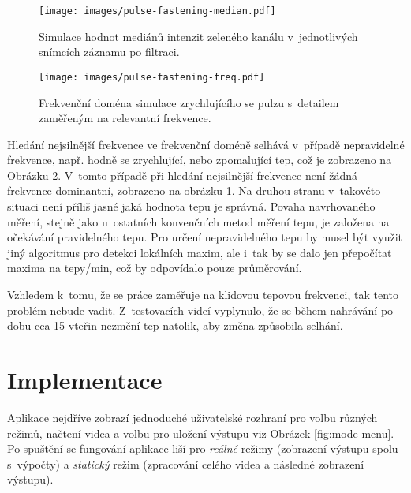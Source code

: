 \documentclass[
  digital, %
  table,   %
%
  lof,     %
  lot,     %
]{fithesis3}
\begin{document}
\begin{figure}
  \begin{center}
    \texttt{[image: images/pulse-fastening-median.pdf]}
  \end{center}
  \caption{Simulace hodnot mediánů intenzit zeleného kanálu v~jednotlivých snímcích záznamu po filtraci.}
  \label{fig:pulse_fastening_median}
\end{figure}

\begin{figure}
  \begin{center}
    \texttt{[image: images/pulse-fastening-freq.pdf]}
  \end{center}
  \caption{Frekvenční doména simulace zrychlujícího se pulzu s~detailem zaměřeným na relevantní frekvence.}
  \label{fig:fastening_pulse_freq}
\end{figure}

Hledání nejsilnější frekvence ve frekvenční doméně selhává v~případě nepravidelné frekvence, např. hodně se zrychlující, nebo  zpomalující tep, což je zobrazeno na Obrázku \ref{fig:fastening_pulse_freq}. V~tomto případě při hledání nejsilnější frekvence není žádná frekvence dominantní, zobrazeno na obrázku \ref{fig:pulse_fastening_median}. Na druhou stranu v~takovéto situaci není příliš jasné jaká hodnota tepu je správná. Povaha navrhovaného měření, stejně jako u~ostatních konvenčních metod měření tepu, je založena na očekávání pravidelného tepu. Pro určení nepravidelného tepu by musel být využit jiný algoritmus pro detekci lokálních maxim, ale i~tak by se dalo jen přepočítat maxima na tepy/min, což by odpovídalo pouze průměrování.  

Vzhledem k~tomu, že se práce zaměřuje na klidovou tepovou frekvenci, tak tento problém nebude vadit. Z~testovacích videí vyplynulo, že se během nahrávání po dobu cca 15 vteřin nezmění tep natolik, aby změna způsobila selhání.


\chapter{Implementace}
Aplikace nejdříve zobrazí jednoduché uživatelské rozhraní pro volbu různých režimů, načtení videa a volbu pro uložení výstupu viz Obrázek \ref{fig:mode-menu}. Po spuštění se fungování aplikace liší pro \emph{reálné} režimy (zobrazení výstupu spolu s~výpočty) a \emph{statický} režim (zpracování celého videa a následné zobrazení výstupu).
\end{document}
